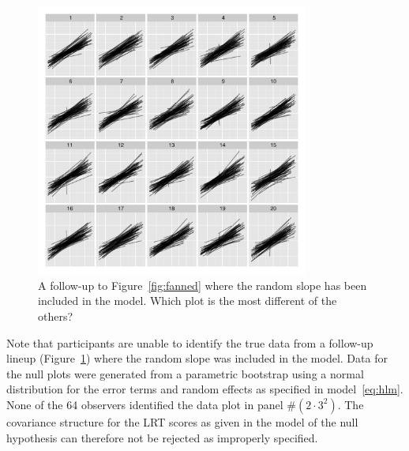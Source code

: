 \documentclass[12pt]{article} %
\newcommand{\alnote}[1]{\todo[inline,color=green!40]{#1}} %
\newcommand{\hhnote}[1]{\todo[inline,color=orange!40]{#1}}
\begin{document}
\begin{figure}
	\centering
	\includegraphics[width = 0.8\textwidth]{normexam_fanned_withslope_lineup18}
	\caption{\label{fig:fanned2} A follow-up to Figure~\ref{fig:fanned} where the random slope has been included in the model. Which plot is the most different of the others?}
\end{figure}

%

{Note that participants are unable to identify the true data from a follow-up lineup (Figure~\ref{fig:fanned2}) where the random slope was included in the model.
Data for the null plots were generated from a parametric bootstrap using a normal distribution for the error terms and random effects as specified in model~\ref{eq:hlm}. 
None of the 64 observers identified the data plot in panel \#$(2\cdot 3^2)$. }
The covariance structure for the LRT scores as  given in the model of the null hypothesis    can therefore not be rejected as improperly specified. 
\end{document}
